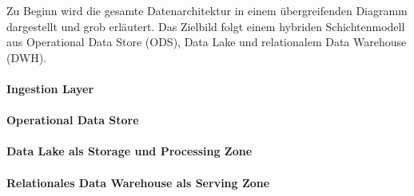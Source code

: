 \label{sec:schichtenmodell}

Zu Beginn wird die gesamte Datenarchitektur in einem übergreifenden Diagramm
dargestellt und grob erläutert. Das Zielbild folgt einem hybriden
Schichtenmodell aus Operational Data Store (ODS), Data Lake und relationalem
Data Warehouse (DWH).

\paragraph{Ingestion Layer}

\paragraph{Operational Data Store}

\paragraph{Data Lake als Storage und Processing Zone}

\paragraph{Relationales Data Warehouse als Serving Zone}
